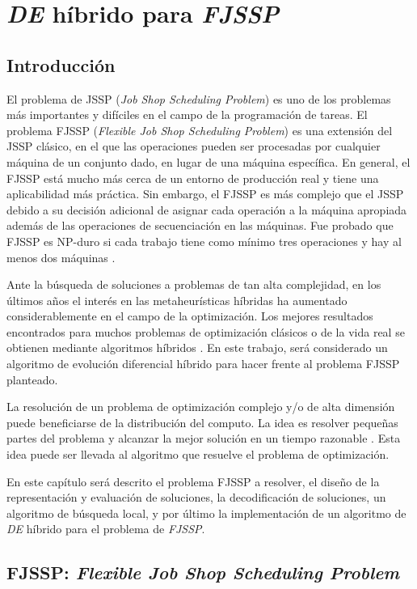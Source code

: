 \chapter{\textit{DE} híbrido para \textit{FJSSP}}
\section{Introducción}

El problema de JSSP (\textit{Job Shop Scheduling Problem}) es uno de los problemas más importantes y difíciles en el campo de la programación de tareas. El problema FJSSP (\textit{Flexible Job Shop Scheduling Problem}) es una extensión del JSSP clásico, en el que las operaciones pueden ser procesadas por cualquier máquina de un conjunto dado, en lugar de una máquina específica. En general, el FJSSP está mucho más cerca de un entorno de producción real y tiene una aplicabilidad más práctica. Sin embargo, el FJSSP es más complejo que el JSSP debido a su decisión adicional de asignar cada operación a la máquina apropiada además de las operaciones de secuenciación en las máquinas. Fue probado que FJSSP es NP-duro si cada trabajo tiene como mínimo tres operaciones y hay al menos dos máquinas \cite{Garey}.


Ante la búsqueda de soluciones a problemas de tan alta complejidad, en los últimos años el interés en las metaheurísticas híbridas ha aumentado considerablemente en el campo de la optimización. Los mejores resultados encontrados para muchos problemas de optimización clásicos o de la vida real se obtienen mediante algoritmos híbridos \cite{Talbi}. En este trabajo, será considerado un algoritmo de evolución diferencial híbrido para hacer frente al problema FJSSP planteado.


La resolución de un problema de optimización complejo y/o de alta dimensión puede beneficiarse de la distribución del computo. La idea es resolver pequeñas partes del problema y alcanzar la mejor solución en un tiempo razonable \cite{Apolloni}. Esta idea puede ser llevada al algoritmo que resuelve el problema de optimización.


En este capítulo será descrito el problema FJSSP a resolver, el diseño de la representación y evaluación de soluciones, la decodificación de soluciones, un algoritmo de búsqueda local, y por último la implementación de un algoritmo de \textit{DE} híbrido para el problema de \textit{FJSSP}. 

\section{FJSSP: \textit{Flexible Job Shop Scheduling Problem}}

